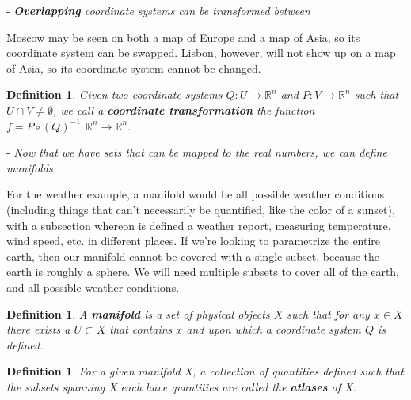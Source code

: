 \documentclass{book}
\newtheorem{defn}[equation]{Definition}
\begin{document}
- \emph{\textbf{Overlapping} coordinate systems can be transformed between}

Moscow may be seen on both a map of Europe and a map of Asia, so its coordinate system can be swapped. Lisbon, however, will not show up on a map of Asia, so its coordinate system cannot be changed. 


\begin{defn}
	Given two coordinate systems  $Q : U \to \mathbb{R}^n$ and $P : V \to \mathbb{R}^n$ such that $U \cap V \neq \emptyset$, we call a \textbf{coordinate transformation} the function $f = P \circ (Q)^{-1} : \mathbb{R}^n \to \mathbb{R}^n$.
\end{defn}




- \emph{Now that we have sets that can be mapped to the real numbers, we can define manifolds}

For the weather example, a manifold would be all possible weather conditions (including things that can't necessarily be quantified, like the color of a sunset), with a subsection whereon is defined a weather report, measuring temperature, wind speed, etc. in different places. If we're looking to parametrize the entire earth, then our manifold cannot be covered with a single subset, because the earth is roughly a sphere. We will need multiple subsets to cover all of the earth, and all possible weather conditions. 


 
\begin{defn}
	A \textbf{manifold} is a set of physical objects $X$ such that for any $x \in X$ there exists a $U \subset X$ that contains $x$ and upon which a coordinate system $Q$ is defined.
\end{defn}

\begin{defn}
	For a given manifold X, a collection of quantities defined such that the subsets spanning X each have quantities are called the \textbf{atlases} of X. 
\end{defn}
\end{document}
